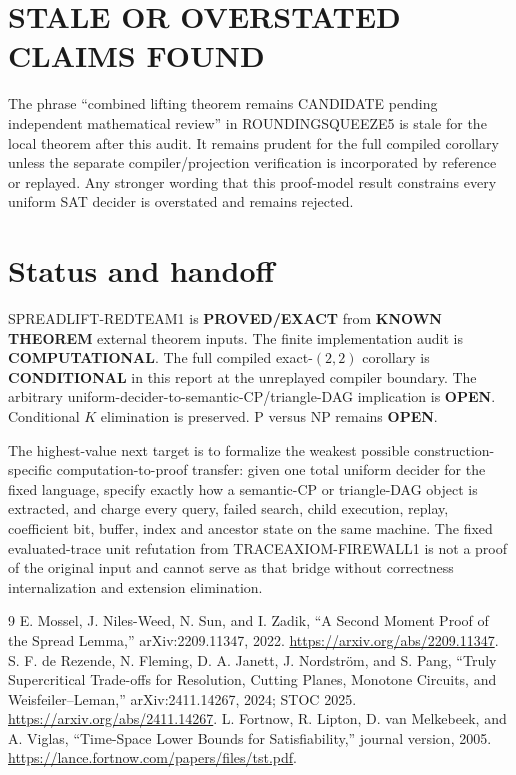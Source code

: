 \documentclass[11pt]{article}
\newcommand{\EXACT}{\textbf{PROVED/EXACT}}
\newcommand{\KNOWN}{\textbf{KNOWN THEOREM}}
\newcommand{\COMP}{\textbf{COMPUTATIONAL}}
\newcommand{\COND}{\textbf{CONDITIONAL}}
\newcommand{\OPEN}{\textbf{OPEN}}
\begin{document}
\section{STALE OR OVERSTATED CLAIMS FOUND}
The phrase ``combined lifting theorem remains CANDIDATE pending independent
mathematical review'' in ROUNDINGSQUEEZE5 is stale for the local theorem
after this audit.  It remains prudent for the full compiled corollary unless
the separate compiler/projection verification is incorporated by reference
or replayed.  Any stronger wording that this proof-model result constrains
every uniform SAT decider is overstated and remains rejected.

\section{Status and handoff}
SPREADLIFT-REDTEAM1 is \EXACT{} from \KNOWN{} external theorem inputs.  The
finite implementation audit is \COMP{}.  The full compiled exact-$(2,2)$
corollary is \COND{} in this report at the unreplayed compiler boundary.
The arbitrary uniform-decider-to-semantic-CP/triangle-DAG implication is
\OPEN.  Conditional $K$ elimination is preserved.  P versus NP remains
\OPEN.

The highest-value next target is to formalize the weakest possible
construction-specific computation-to-proof transfer: given one total
uniform decider for the fixed language, specify exactly how a semantic-CP or
triangle-DAG object is extracted, and charge every query, failed search,
child execution, replay, coefficient bit, buffer, index and ancestor state
on the same machine.  The fixed evaluated-trace unit refutation from
TRACEAXIOM-FIREWALL1 is not a proof of the original input and cannot serve as
that bridge without correctness internalization and extension elimination.

\begin{thebibliography}{9}
 E. Mossel, J. Niles-Weed, N. Sun, and I. Zadik,
``A Second Moment Proof of the Spread Lemma,'' arXiv:2209.11347, 2022.
\url{https://arxiv.org/abs/2209.11347}.
 S. F. de Rezende, N. Fleming, D. A. Janett,
J. Nordstr\"om, and S. Pang, ``Truly Supercritical Trade-offs for
Resolution, Cutting Planes, Monotone Circuits, and Weisfeiler--Leman,''
arXiv:2411.14267, 2024; STOC 2025.
\url{https://arxiv.org/abs/2411.14267}.
 L. Fortnow, R. Lipton, D. van Melkebeek, and A. Viglas,
``Time-Space Lower Bounds for Satisfiability,'' journal version, 2005.
\url{https://lance.fortnow.com/papers/files/tst.pdf}.
\end{thebibliography}

\end{document}
